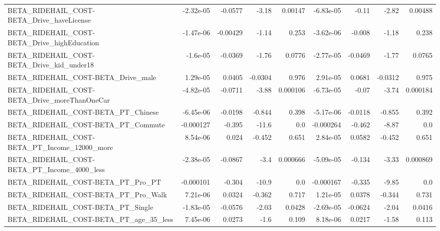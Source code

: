 \begin{tabular}{lrrrrrrrr}
BETA\_RIDEHAIL\_COST-BETA\_Drive\_haveLicense          &   -2.32e-05 &      -0.0577 &     -3.18 &  0.00147 &  -6.83e-05 &       -0.11 &        -2.82 &       0.00488 \\
BETA\_RIDEHAIL\_COST-BETA\_Drive\_highEducation        &   -1.47e-06 &     -0.00429 &     -1.14 &    0.253 &  -3.62e-06 &      -0.008 &        -1.18 &         0.238 \\
BETA\_RIDEHAIL\_COST-BETA\_Drive\_kid\_under18          &    -1.6e-05 &      -0.0369 &     -1.76 &   0.0776 &  -2.77e-05 &     -0.0469 &        -1.77 &        0.0765 \\
BETA\_RIDEHAIL\_COST-BETA\_Drive\_male                 &    1.29e-05 &       0.0405 &   -0.0304 &    0.976 &   2.91e-05 &      0.0681 &      -0.0312 &         0.975 \\
BETA\_RIDEHAIL\_COST-BETA\_Drive\_moreThanOneCar       &   -4.82e-05 &      -0.0711 &     -3.88 & 0.000106 &  -6.73e-05 &       -0.07 &        -3.74 &      0.000184 \\
BETA\_RIDEHAIL\_COST-BETA\_PT\_Chinese                 &   -6.45e-06 &      -0.0198 &    -0.844 &    0.398 &  -5.17e-06 &     -0.0118 &       -0.855 &         0.392 \\
BETA\_RIDEHAIL\_COST-BETA\_PT\_Commute                 &   -0.000127 &       -0.395 &     -11.6 &      0.0 &  -0.000264 &      -0.462 &        -8.87 &           0.0 \\
BETA\_RIDEHAIL\_COST-BETA\_PT\_Income\_12000\_more       &    8.54e-06 &        0.024 &    -0.452 &    0.651 &   2.84e-05 &      0.0582 &       -0.452 &         0.651 \\
BETA\_RIDEHAIL\_COST-BETA\_PT\_Income\_4000\_less        &   -2.38e-05 &      -0.0867 &      -3.4 & 0.000666 &  -5.09e-05 &      -0.134 &        -3.33 &      0.000869 \\
BETA\_RIDEHAIL\_COST-BETA\_PT\_Pro\_PT                  &   -0.000101 &       -0.304 &     -10.9 &      0.0 &  -0.000167 &      -0.335 &        -9.85 &           0.0 \\
BETA\_RIDEHAIL\_COST-BETA\_PT\_Pro\_Walk                &    7.21e-06 &       0.0324 &    -0.362 &    0.717 &   1.21e-05 &      0.0378 &       -0.344 &         0.731 \\
BETA\_RIDEHAIL\_COST-BETA\_PT\_Single                  &   -1.83e-05 &      -0.0576 &     -2.03 &   0.0428 &  -2.69e-05 &     -0.0624 &        -2.04 &        0.0416 \\
BETA\_RIDEHAIL\_COST-BETA\_PT\_age\_35\_less             &    7.45e-06 &       0.0273 &      -1.6 &    0.109 &   8.18e-06 &      0.0217 &        -1.58 &         0.113 \\

\end{tabular}
